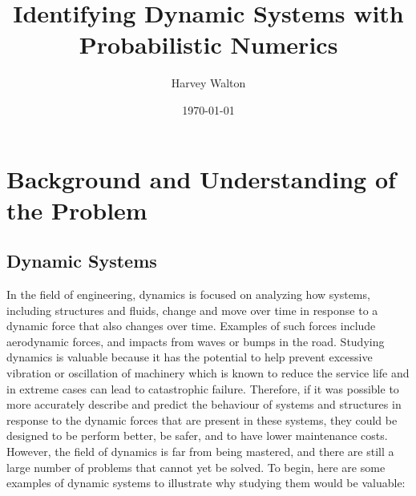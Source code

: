 \documentclass[12pt]{article}
\title{Identifying Dynamic Systems with Probabilistic Numerics}
\author{Harvey Walton}
\date{\today}
\begin{document}

    \thispagestyle{empty}
    

    \printnomenclature

    \newpage
    \tableofcontents
    \newpage


    \section{Background and Understanding of the Problem}

    \subsection{Dynamic Systems}
    In the field of engineering, dynamics is focused on analyzing how systems, including structures and fluids, change and move over time in response to a dynamic force that also changes over time.
    Examples of such forces include aerodynamic forces, and impacts from waves or bumps in the road.
    Studying dynamics is valuable because it has the potential to help prevent excessive vibration or oscillation of machinery which is known to reduce the service life and in extreme cases can lead to catastrophic failure.
    Therefore, if it was possible to more accurately describe and predict the behaviour of systems and structures in response to the dynamic forces that are present in these systems, they could be designed to be perform better, be safer, and to have lower maintenance costs.
    However, the field of dynamics is far from being mastered, and there are still a large number of problems that cannot yet be solved.
    To begin, here are some examples of dynamic systems to illustrate why studying them would be valuable:
\end{document}
